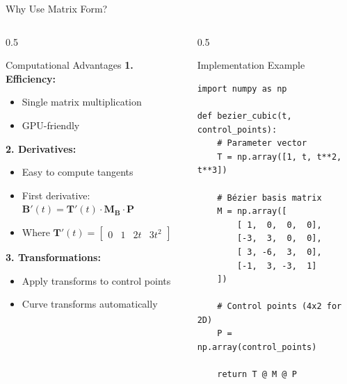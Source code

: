 \begin{frame}[fragile]{Why Use Matrix Form?}
  \begin{columns}
    \begin{column}{0.5\textwidth}
      \begin{conceptbox}{Computational Advantages}
        \footnotesize
        \textbf{1. Efficiency:}
        \begin{itemize}
          \item Single matrix multiplication
          \item GPU-friendly
        \end{itemize}

        \textbf{2. Derivatives:}
        \begin{itemize}
          \item Easy to compute tangents
          \item First derivative: $\mathbf{B}'(t) = \mathbf{T}'(t) \cdot \mathbf{M_B} \cdot \mathbf{P}$
          \item Where $\mathbf{T}'(t) =
            \begin{bmatrix} 0 & 1 & 2t & 3t^2
            \end{bmatrix}$
        \end{itemize}

        \textbf{3. Transformations:}
        \begin{itemize}
          \item Apply transforms to control points
          \item Curve transforms automatically
        \end{itemize}
      \end{conceptbox}
    \end{column}
    \begin{column}{0.5\textwidth}
      \begin{conceptbox}{Implementation Example}
        \scriptsize
        \begin{verbatim}
import numpy as np

def bezier_cubic(t, control_points):
    # Parameter vector
    T = np.array([1, t, t**2, t**3])

    # Bézier basis matrix
    M = np.array([
        [ 1,  0,  0,  0],
        [-3,  3,  0,  0],
        [ 3, -6,  3,  0],
        [-1,  3, -3,  1]
    ])

    # Control points (4x2 for 2D)
    P = np.array(control_points)

    return T @ M @ P
        \end{verbatim}
      \end{conceptbox}
    \end{column}
  \end{columns}
\end{frame}
